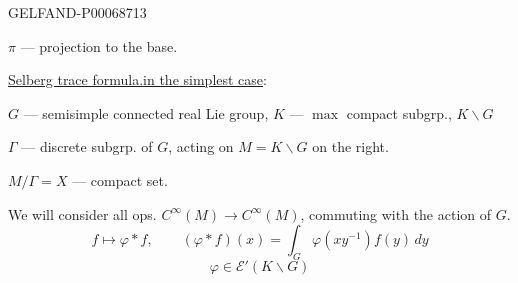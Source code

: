 \begin{GelfandAdjacentEvidence}{GELFAND-P000687}{13}


\(\pi\) --- projection to the base.

\underline{\underline{Selberg trace formula.}}\qquad \underline{in the simplest case}:

\(G\) --- semisimple connected real Lie group, \(K\) --- \(\max\) compact subgrp., \(K\backslash G\)
\end{GelfandAdjacentEvidence}


\(\Gamma\) --- discrete subgrp. of \(G\), acting on \(M=K\backslash G\) on the right.

\(M/\Gamma=X\) --- compact set.

We will consider all ops. \(C^\infty(M)\to C^\infty(M)\),
commuting with the action of \(G\).
\[
f\longmapsto\varphi*f,\qquad
(\varphi*f)(x)=\int_G\varphi(xy^{-1})f(y)\,dy
\]
\[
\varphi\in\mathcal E'(K\backslash G)
\]


